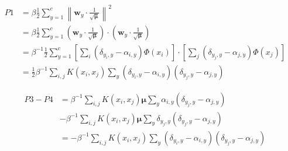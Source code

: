\documentclass{article}
\begin{document}
\begin{align}
    P1 & =\beta \frac{1}{2}  \sum_{y=1}^{c} {\left\|\mathbf{w}_{y} \cdot \frac{1}{\sqrt{\bm{\mu}}} \right\|^{2}}                             \\
       & = \beta\frac{1}{2}  \sum_{y=1}^{c} (\mathbf{w}_{y} \cdot \frac{1}{\sqrt{\bm{\mu}}}) \cdot (\mathbf{w}_{y} \cdot \frac{1}{\sqrt{\bm{\mu}}}) \\
       & = \beta^{-1} \frac{1}{2} \sum_{y=1}^{c}
    \left[\sum_{i}\left(\delta_{y_{i}, y}-\alpha_{i, y}\right) \Phi({x}_{i})\right] \cdot
    \left[\sum_{j}\left(\delta_{y_{j}, y}-\alpha_{j, y}\right) \Phi({x}_{j})\right]                                                   \\
       & = \frac{1}{2} \beta^{-1} \sum_{i,j} K(x_i, x_j) \sum_{y}
    (\delta_{y_i, y}-\alpha_{i, y}) (\delta_{y_j, y}-\alpha_{j, y})
\end{align}

\begin{align}
    P3 - P4
     & = \beta^{-1} \sum_{i, j} K(x_i, x_j) \bm{\mu}
    \sum_{y} \alpha_{i, y} \left(\delta_{y_{j}, y}-\alpha_{j, y}\right) \\
     & -
    \beta^{-1}
    \sum_{i, j} K(x_i, x_j) \bm{\mu}
    \sum_{y} \delta_{y_{j}, y} (\delta_{y_{j}, y}-\alpha_{j, y})        \\
     & = - \beta^{-1} \sum_{i,j} K(x_i, x_j) \sum_{y}
    (\delta_{y_i, y}-\alpha_{i, y}) (\delta_{y_j, y}-\alpha_{j, y})
\end{align}
\end{document}
